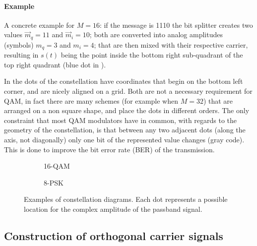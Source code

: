 \paragraph{Example}

A concrete example for \(M = 16\): if the message is 1110 the bit splitter creates two values \(\vec{m}_q = 11\) and \(\vec{m}_i = 10\); both are converted into analog amplitudes (symbols) \(m_q = 3\) and \(m_i = 4\); that are then mixed with their respective carrier, resulting in \(s(t)\) being the point inside the bottom right sub-quadrant of the top right quadrant (blue dot in ).
\vspace{1em}

In  the dots of the constellation have coordinates that begin on the bottom left corner, and are nicely aligned on a grid. Both are not a necessary requirement for QAM, in fact there are many schemes (for example when \(M = 32\)) that are arranged on a non square shape, and place the dots in different orders. The only constraint that most QAM modulators have in common, with regards to the geometry of the constellation, is that between any two adjacent dots (along the axis, not diagonally) only one bit of the represented value changes (gray code). This is done to improve the bit error rate (BER) of the transmission.

\begin{figure}
	\hfill
	\begin{subfigure}{.4\linewidth}
		
		\caption{16-QAM\label{fig:qam-constellation}}
	\end{subfigure}
	\hfill
	\begin{subfigure}{.4\linewidth}
		
		\caption{8-PSK\label{fig:psk-constellation}}
	\end{subfigure}
	\hfill
	\caption{
		Examples of constellation diagrams. Each dot represents a possible location for the complex amplitude of the passband signal.
	}
\end{figure}

\subsection{Construction of orthogonal carrier signals}


